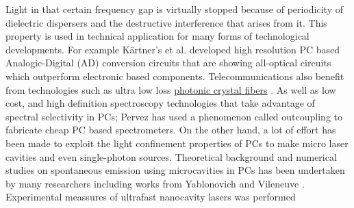 Light in that certain frequency gap is virtually stopped because of periodicity of dielectric dispersers and the destructive interference that arises from it. This property is used in technical application for many forms of technological developments. For example Kärtner's et al. developed high resolution PC based Analogic-Digital (AD) conversion circuits \cite{F.X.Kaertner2006} that are showing all-optical circuits which outperform electronic based components. Telecommunications also benefit from technologies such as ultra low loss \href{http://en.wikipedia.org/wiki/Photonic-crystal_fiber}{photonic crystal fibers} \cite{A.M.Apetrei2005}. As well as low cost, and high definition spectroscopy technologies that take advantage of spectral selectivity in PCs; Pervez \cite{Pervez2010} has used a phenomenon called outcoupling to fabricate cheap PC based spectrometers. On the other hand, a lot of effort has been made to exploit the light confinement properties of PCs to make micro laser cavities and even single-photon sources. Theoretical background and numerical studies on spontaneous emission using microcavities in PCs has been undertaken by many researchers including works from Yablonovich and Vileneuve \cite{Yablonovich1987,Yablonovich1991,Villeneuve1996}. Experimental meassures of ultrafast nanocavity lasers was performed 